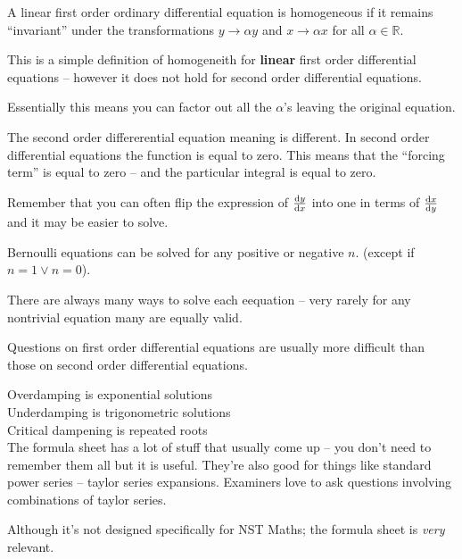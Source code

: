 \documentclass[10pt,\jkfside,a4paper]{article}
\begin{document}
A linear first order ordinary differential equation is homogeneous if it remains ``invariant'' 
under the transformations $y \rightarrow \alpha y$ and $x \rightarrow \alpha x$ for all $\alpha \in 
\mathbb{R}$.

This is a simple definition of homogeneith for \textbf{linear} first order differential equations -- however 
it does not hold for second order differential equations.

Essentially this means you can factor out all the $\alpha$'s leaving the original equation.

The second order differerential equation meaning is different.
In second order differential equations the function is equal to zero. This means that the ``forcing term'' is 
equal to zero -- and the particular integral is equal to zero.

Remember that you can often flip the expression of $\dv{y}{x}$ into one in terms of $\dv{x}{y}$ and 
it may be easier to solve.

Bernoulli equations can be solved for any positive or negative $n$. (except if $n = 1 \vee n = 0$).

There are always many ways to solve each eequation -- very rarely for any nontrivial equation many 
are equally valid.

Questions on first order differential equations are usually more difficult than those on second order 
differential equations.

Overdamping is exponential solutions\\
Underdamping is trigonometric solutions\\
Critical dampening is repeated roots\\

The formula sheet has a lot of stuff that usually come up -- you don't need to remember them all but it is useful.
They're also good for things like standard power series -- taylor series expansions.
Examiners love to ask questions involving combinations of taylor series.

Although it's not designed specifically for NST Maths; the formula sheet is \textit{very} relevant.
\end{document}
